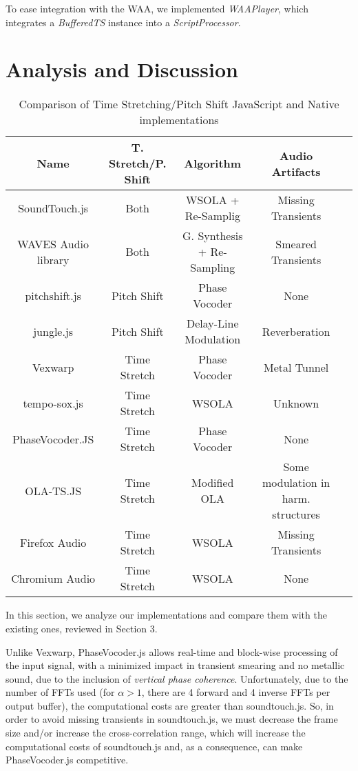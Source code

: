 \documentclass{sig-alternate}
\begin{document}
\begin{sloppypar}
To ease integration with the WAA, we implemented \textit{WAAPlayer}, which integrates a \textit{BufferedTS} instance into a \textit{ScriptProcessor}.





\section{Analysis and Discussion}

\begin{table*}
	\centering
	\caption{Comparison of Time Stretching/Pitch Shift JavaScript and Native implementations}
	\begin{tabular}{|c|c|c|c|c|} \hline
	\textbf{Name}			& \textbf{T. Stretch/P. Shift}	&\textbf{Algorithm}		& \textbf{Audio Artifacts}\\ \hline
	SoundTouch.js 			& Both 					& WSOLA + Re-Samplig		& Missing Transients \\ \hline
	WAVES Audio library		& Both					& G. Synthesis + Re-Sampling	& Smeared Transients \\ \hline
	pitchshift.js				& Pitch Shift				& Phase Vocoder 			& None \\ \hline
	jungle.js					& Pitch Shift				& Delay-Line Modulation	& Reverberation \\ \hline
	Vexwarp					& Time Stretch			& Phase Vocoder 			& Metal Tunnel \\ \hline
	tempo-sox.js				& Time Stretch			& WSOLA					& Unknown \\ \hline
	PhaseVocoder.JS 			& Time Stretch			& Phase Vocoder 			& None \\ \hline
	OLA-TS.JS 				& Time Stretch			& Modified OLA			& Some modulation in harm. structures \\ \hline
	Firefox Audio		& Time Stretch			& WSOLA 				& Missing Transients \\ \hline
	Chromium Audio 	& Time Stretch			& WSOLA 				& None \\
	\hline\end{tabular}
\end{table*}

In this section, we analyze our implementations and compare them with the existing ones, reviewed in Section 3.
\begin{sloppypar}
Unlike Vexwarp, PhaseVocoder.js allows real-time and block-wise processing of the input signal, with a minimized impact in transient smearing and no metallic sound, due to the inclusion of \textit{vertical phase coherence}. Unfortunately, due to the number of FFTs used (for $\alpha>1$, there are 4 forward and 4 inverse FFTs per output buffer), the computational costs are greater than soundtouch.js. So, in order to avoid missing transients in soundtouch.js, we must decrease the frame size and/or increase the cross-correlation range, which will increase the computational costs of soundtouch.js and, as a consequence, can make PhaseVocoder.js competitive.
\end{sloppypar}


\end{sloppypar}
\end{document}
